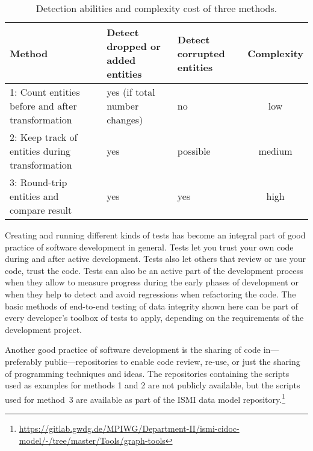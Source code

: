 \documentclass[final]{anthology-ch} %
\begin{document}
\begin{table}[h]
  \centering
  \begin{tabular}{>{\raggedright}p{} >{\centering}p{} >{\centering}p{} c}
    Method & Detect dropped or added entities & Detect corrupted entities & Complexity \\ \midrule
    1: Count entities before and after transformation & yes (if total number changes) & no & low \\ \midrule
    2: Keep track of entities during transformation & yes & possible & medium \\ \midrule
    3: Round-trip entities and compare result & yes & yes & high \\ \bottomrule
  \end{tabular}
  \caption{Detection abilities and complexity cost of three methods.}
  \label{tab:method-abilities}
\end{table}

Creating and running different kinds of tests has become an integral part of good practice of software development in general. Tests let you trust your own code during and after active development. Tests also let others that review or use your code, trust the code. Tests can also be an active part of the development process when they allow to measure progress during the early phases of development or when they help to detect and avoid regressions when refactoring the code. The basic methods of end-to-end testing of data integrity shown here can be part of every developer's toolbox of tests to apply, depending on the requirements of the development project.

Another good practice of software development is the sharing of code in---preferably public---repositories to enable code review, re-use, or just the sharing of programming techniques and ideas. The repositories containing the scripts used as examples for methods 1 and 2 are not publicly available, but the scripts used for method~3 are available as part of the ISMI data model repository.\footnote{\url{https://gitlab.gwdg.de/MPIWG/Department-II/ismi-cidoc-model/-/tree/master/Tools/graph-tools}}


\printbibliography

\end{document}
